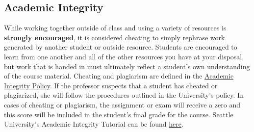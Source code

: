 \documentclass[16pt]{article}
\begin{document}
	\subsection*{Academic Integrity} 
	While working together outside of class and using a variety of resources is \textbf{strongly encouraged}, it is considered cheating to simply rephrase work generated by another student or outside resource. Students are encouraged to learn from one another and all of the other resources you have at your disposal, but work that is handed in must ultimately reflect a student's own understanding of the course material. Cheating and plagiarism are defined in the \href{https://www.seattleu.edu/media/redhawk-service-center/registrar/registrar-policies/Academic-Integrity-2011-03-Interim-Update-3.24.23.pdf}{Academic Integrity Policy}. If the professor suspects that a student has cheated or plagiarized, she will follow the procedures outlined in the University's policy. In cases of cheating or plagiarism, the assignment or exam will receive a zero and this score will be included in the student's final grade for the course. Seattle University's Academic Integrity Tutorial can be found \href{https://www.seattleu.edu/academic-integrity/resources-for-students/}{here}.
	
\end{document}
